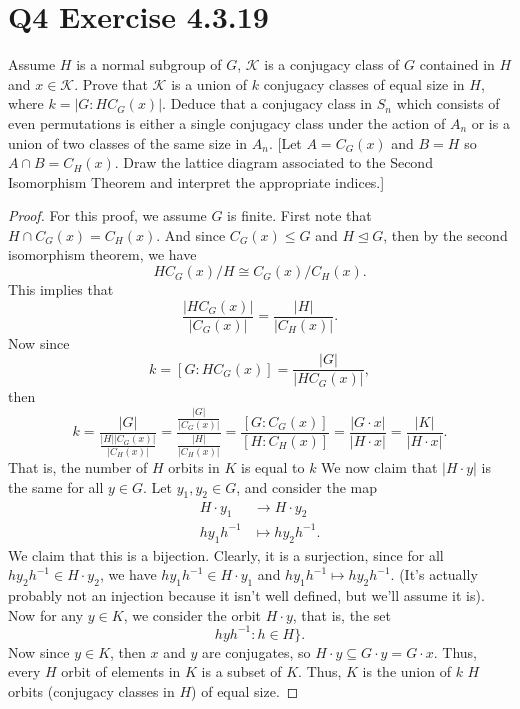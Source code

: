\documentclass[12pt]{article}
\newenvironment{problem}
    {\begin{lrbox}{\mybox}\begin{minipage}{0.98\textwidth}}
    {\end{minipage}\end{lrbox}\framebox[\textwidth]{\usebox{\mybox}}}
\newcommand{\<}{\left\langle} %
\renewcommand{\>}{\right\rangle} %
\let\teq\trianglelefteq %
\let\iso\cong %
\newcommand{\KK}{\mathcal{K}}
\begin{document}
\newpage
\section*{Q4 Exercise 4.3.19}
\begin{problem}
    Assume $H$ is a normal subgroup of $G$, $\KK$ is a conjugacy class of $G$ contained in $H$ and $x\in\KK$. Prove that $\KK$ is a union of $k$ conjugacy classes of equal size in $H$, where $k=|G : HC_G(x)|$. Deduce that a conjugacy class in $S_n$ which consists of even permutations is either a single conjugacy class under the action of $A_n$ or is a union of two classes of the same size in $A_n$. [Let $A=C_G(x)$ and $B=H$ so $A\cap B = C_H(x)$. Draw the lattice diagram associated to the Second Isomorphism Theorem and interpret the appropriate indices.]
\end{problem}

\begin{proof}
    For this proof, we assume $G$ is finite. First note that $H \cap C_G(x) = C_H(x)$. And since $C_G(x) \leq G$ and $H \teq G$, then by the second isomorphism theorem, we have
    \[HC_G(x)/H \iso C_G(x)/C_H(x).\]
    This implies that
    \[\frac{|HC_G(x)|}{|C_G(x)|} = \frac{|H|}{|C_H(x)|}.\]
    Now since
    \[k = [G : HC_G(x)] = \frac{|G|}{|HC_G(x)|},\]
    then
    \[k = \frac{|G|}{\frac{|H| |C_G(x)|}{|C_H(x)|}} = \frac{\frac{|G|}{|C_G(x)|}}{\frac{|H|}{|C_H(x)|}} = \frac{[G : C_G(x)]}{[H : C_H(x)]} = \frac{|G\cdot x|}{|H \cdot x|} = \frac{|K|}{|H\cdot x|}.\]
    That is, the number of $H$ orbits in $K$ is equal to $k$ We now claim that $|H\cdot y|$ is the same for all $y\in G$. Let $y_1, y_2 \in G$, and consider the map
    \begin{align*}
        H\cdot y_1 &\to H\cdot y_2 \\
        hy_1h^{-1} &\mapsto hy_2h^{-1}.
    \end{align*}
    We claim that this is a bijection. Clearly, it is a surjection, since for all $hy_2h^{-1} \in H\cdot y_2$, we have $hy_1h^{-1} \in H\cdot y_1$ and $hy_1h^{-1} \mapsto hy_2h^{-1}$. (It's actually probably not an injection because it isn't well defined, but we'll assume it is). Now for any $y\in K$, we consider the orbit $H\cdot y$, that is, the set
    \[hyh^{-1} : h\in H\}.\]
    Now since $y\in K$, then $x$ and $y$ are conjugates, so $H\cdot y \subseteq G\cdot y = G\cdot x$. Thus, every $H$ orbit of elements in $K$ is a subset of $K$. Thus, $K$ is the union of $k$ $H$ orbits (conjugacy classes in $H$) of equal size.
    
\end{proof}
\end{document}
